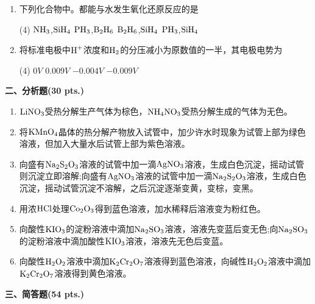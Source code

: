 \begin{enumerate}[label=\arabic*., itemsep=1.5ex]
\begin{tasks}
        \task $\ce{H5IO6}$
    \end{tasks}
    \item 下列化合物中。都能与水发生氧化还原反应的是
    \begin{tasks}(4)
        \task $\ce{NH3}$,$\ce{SiH4}$
        \task $\ce{PH3}$,$\ce{B2H6}$
        \task $\ce{B2H6}$,$\ce{SiH4}$
        \task $\ce{PH3}$,$\ce{SiH4}$
    \end{tasks}
    \item 将标准电极中$\ce{H+}$浓度和$\ce{H2}$的分压减小为原数值的一半，其电极电势为
    \begin{tasks}(4)
        \task $0V$
        \task $0.009V$
        \task $-0.004V$
        \task $-0.009V$
    \end{tasks}
\end{enumerate}

\vspace{0.5cm}
\noindent\textbf{二、分析题(30 pts.)}

\begin{enumerate}[label=\arabic*., start=1, itemsep=1.5ex]
    \item $\ce{LiNO3}$受热分解生产气体为棕色，$\ce{NH4NO3}$受热分解生成的气体为无色。
    \item 将$\ce{KMnO4}$晶体的热分解产物放入试管中，加少许水时现象为试管上部为绿色溶液，但加入大量水后试管上部为紫色溶液。
    \item 向盛有$\ce{Na2S2O3}$溶液的试管中加一滴$\ce{AgNO3}$溶液，生成白色沉淀，摇动试管则沉淀立即溶解;向盛有$\ce{AgNO3}$溶液的试管中加一滴$\ce{Na2S2O3}$溶液，生成白色沉淀，摇动试管沉淀不溶解，之后沉淀逐渐变黄，变棕，变黑。
    \item 用浓$\ce{HCl}$处理$\ce{Co2O3}$得到蓝色溶液，加水稀释后溶液变为粉红色。
    \item 向酸性$\ce{KIO3}$的淀粉溶液中滴加$\ce{Na2SO3}$溶液，溶液先变蓝后变无色;向$\ce{Na2SO3}$的淀粉溶液中滴加酸性$\ce{KIO3}$溶液，溶液先无色后变蓝。
    \item 向酸性$\ce{H2O2}$溶液中滴加$\ce{K2Cr2O7}$溶液得到蓝色溶液，向碱性$\ce{H2O2}$溶液中滴加$\ce{K2Cr2O7}$溶液得到黄色溶液。
\end{enumerate}

\vspace{0.5cm}
\noindent\textbf{三、简答题(54 pts.)}

